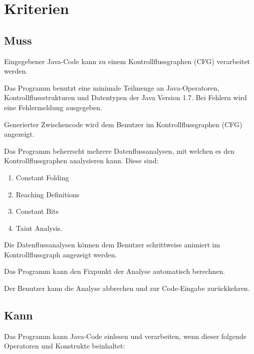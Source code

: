 
\section{Kriterien}

\subsection{Muss}

Eingegebener Java-Code kann zu einem Kontrollflussgraphen (CFG) verarbeitet werden.

Das Programm benutzt eine minimale Teilmenge an Java-Operatoren, Kontrollflussstrukturen und Datentypen der Java Version 1.7. Bei Fehlern wird eine Fehlermeldung ausgegeben.

Generierter Zwischencode wird dem Benutzer im Kontrollflussgraphen (CFG) angezeigt.

Das Programm beherrscht mehrere Datenflussanalysen, mit welchen es den Kontrollflussgraphen analysieren kann.
Diese sind:\par
\begin{enumerate}[label=(\alph*)]
\item Constant Folding
\item Reaching Definitions
\item Constant Bits
\item Taint Analysis.
\end{enumerate}

Die Datenflussanalysen können dem Benutzer schrittweise animiert im Kontrollflussgraph angezeigt werden.

Das Programm kann den Fixpunkt der Analyse automatisch berechnen.

Der Benutzer kann die Analyse abbrechen und zur Code-Eingabe zurückkehren.

\subsection{Kann}

Das Programm kann Java-Code einlesen und verarbeiten, wenn dieser folgende Operatoren und Konstrukte beinhaltet:


